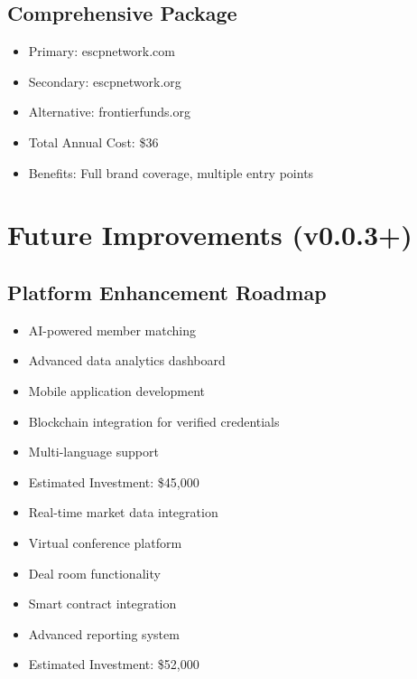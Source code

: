 \documentclass[11pt,a4paper]{article}
\begin{document}
\subsection{Comprehensive Package}
\begin{tcolorbox}[colback=white,colframe=secondaryGreen!20]
\begin{itemize}[leftmargin=*]
    \item Primary: escpnetwork.com
    \item Secondary: escpnetwork.org
    \item Alternative: frontierfunds.org
    \item Total Annual Cost: \$36
    \item Benefits: Full brand coverage, multiple entry points
\end{itemize}
\end{tcolorbox}

\section{Future Improvements (v0.0.3+)}

\subsection{Platform Enhancement Roadmap}
\begin{tcolorbox}[colback=white,colframe=warningOrange!20,title=Version 0.0.3]
\begin{itemize}[leftmargin=*]
    \item AI-powered member matching
    \item Advanced data analytics dashboard
    \item Mobile application development
    \item Blockchain integration for verified credentials
    \item Multi-language support
    \item Estimated Investment: \$45,000
\end{itemize}
\end{tcolorbox}

\begin{tcolorbox}[colback=white,colframe=warningOrange!20,title=Version 0.0.4]
\begin{itemize}[leftmargin=*]
    \item Real-time market data integration
    \item Virtual conference platform
    \item Deal room functionality
    \item Smart contract integration
    \item Advanced reporting system
    \item Estimated Investment: \$52,000
\end{itemize}
\end{tcolorbox}
\end{document}
